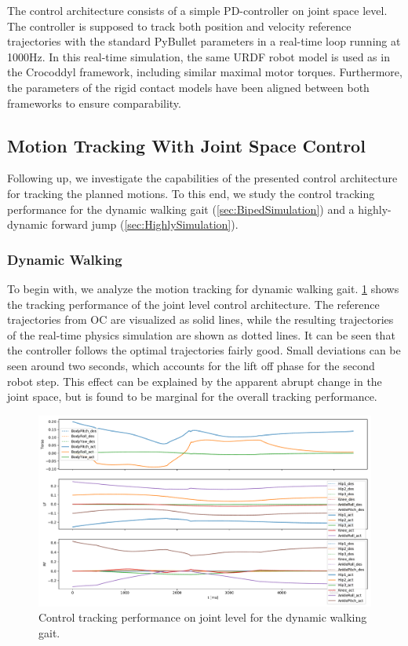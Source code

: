 The control architecture consists of a simple PD-controller on joint space level. The controller is supposed to track both position and velocity reference trajectories with the standard PyBullet parameters in a real-time loop running at 1000Hz. In this real-time simulation, the same URDF robot model is used as in the Crocoddyl framework, including similar maximal motor torques. Furthermore, the parameters of the rigid contact models have been aligned between both frameworks to ensure comparability.

\subsection{Motion Tracking With Joint Space Control}
Following up, we investigate the capabilities of the presented control architecture for tracking the planned motions. To this end, we study the control tracking performance for the dynamic walking gait (\cref{sec:BipedSimulation}) and a highly-dynamic forward jump (\cref{sec:HighlySimulation}).

\subsubsection{Dynamic Walking}
To begin with, we analyze the motion tracking for dynamic walking gait. \cref{fig:walkDynamic_pybulletTracking} shows the tracking performance of the joint level control architecture. The reference trajectories from \gls{OC} are visualized as solid lines, while the resulting trajectories of the real-time physics simulation are shown as dotted lines. It can be seen that the controller follows the optimal trajectories fairly good. Small deviations can be seen around two seconds, which accounts for the lift off phase for the second robot step. This effect can be explained by the apparent abrupt change in the joint space, but is found to be marginal for the overall tracking performance. 
\begin{figure}[h!]
\centering	
\includegraphics[width=1\textwidth]{fig/walkDynamic/pybullet/pybulletTracking}
\caption{Control tracking performance on joint level for the dynamic walking gait.}
\label{fig:walkDynamic_pybulletTracking}
\end{figure}

